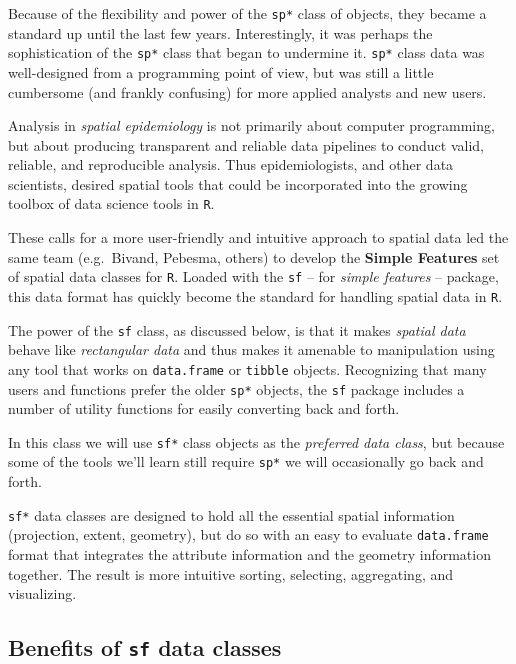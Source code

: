 \documentclass[
]{book}
\newenvironment{rmdnote}[1]
  {
  \begin{itemize}
  \renewcommand{\labelitemi}{
    \raisebox{-.7\height}[0pt][0pt]{
      {\setkeys{Gin}{width=3em,keepaspectratio}\texttt{[image: images/\#1]}}
    }
  }
  \setlength{\fboxsep}{1em}
  \begin{note}
  \item
  }
  {
  \end{note}
  \end{itemize}
  }
\begin{document}
Because of the flexibility and power of the \texttt{sp*} class of objects, they became a standard up until the last few years. Interestingly, it was perhaps the sophistication of the \texttt{sp*} class that began to undermine it. \texttt{sp*} class data was well-designed from a programming point of view, but was still a little cumbersome (and frankly confusing) for more applied analysts and new users.

Analysis in \emph{spatial epidemiology} is not primarily about computer programming, but about producing transparent and reliable data pipelines to conduct valid, reliable, and reproducible analysis. Thus epidemiologists, and other data scientists, desired spatial tools that could be incorporated into the growing toolbox of data science tools in \texttt{R}.

These calls for a more user-friendly and intuitive approach to spatial data led the same team (e.g.~Bivand, Pebesma, others) to develop the \textbf{Simple Features} set of spatial data classes for \texttt{R}. Loaded with the \texttt{sf} -- for \emph{simple features} -- package, this data format has quickly become the standard for handling spatial data in \texttt{R}.

The power of the \texttt{sf} class, as discussed below, is that it makes \emph{spatial data} behave like \emph{rectangular data} and thus makes it amenable to manipulation using any tool that works on \texttt{data.frame} or \texttt{tibble} objects. Recognizing that many users and functions prefer the older \texttt{sp*} objects, the \texttt{sf} package includes a number of utility functions for easily converting back and forth.

\begin{rmdnote}{note}
In this class we will use \texttt{sf*} class objects as the \emph{preferred data class}, but because some of the tools we'll learn still require \texttt{sp*} we will occasionally go back and forth.

\end{rmdnote}

\texttt{sf*} data classes are designed to hold all the essential spatial information (projection, extent, geometry), but do so with an easy to evaluate \texttt{data.frame} format that integrates the attribute information and the geometry information together. The result is more intuitive sorting, selecting, aggregating, and visualizing.

\hypertarget{benefits-of-sf-data-classes}{%
\subsection{\texorpdfstring{Benefits of \texttt{sf} data classes}{Benefits of sf data classes}}\label{benefits-of-sf-data-classes}}
\end{document}
